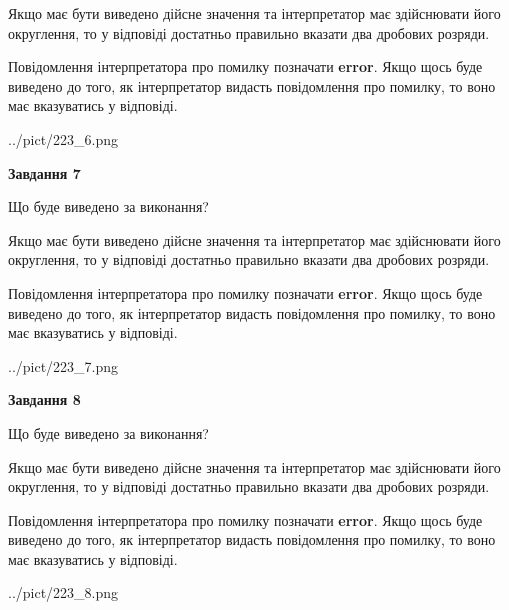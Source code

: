 \documentclass[12pt, ukrainian]{article}
\begin{document}
{\begin {Large}
Якщо має бути виведено дійсне значення та інтерпретатор має здійснювати його округлення, 
то у відповіді достатньо правильно вказати два дробових розряди.

Повідомлення інтерпретатора про помилку позначати \textbf{error}.
Якщо щось буде виведено до того, як інтерпретатор видасть повідомлення про помилку, 
то воно має вказуватись у відповіді. \par

\begin{center}
	{../pict/223_6.png}
\end{center}
\newpage

{\begin {center}\textbf{Завдання 7}\end {center}}\par
Що буде виведено за виконання? \par

Якщо має бути виведено дійсне значення та інтерпретатор має здійснювати його округлення, 
то у відповіді достатньо правильно вказати два дробових розряди.

Повідомлення інтерпретатора про помилку позначати \textbf{error}.
Якщо щось буде виведено до того, як інтерпретатор видасть повідомлення про помилку, 
то воно має вказуватись у відповіді. \par

\begin{center}
	{../pict/223_7.png}
\end{center}
\newpage

{\begin {center}\textbf{Завдання 8}\end {center}}\par
Що буде виведено за виконання? \par

Якщо має бути виведено дійсне значення та інтерпретатор має здійснювати його округлення, 
то у відповіді достатньо правильно вказати два дробових розряди.

Повідомлення інтерпретатора про помилку позначати \textbf{error}.
Якщо щось буде виведено до того, як інтерпретатор видасть повідомлення про помилку, 
то воно має вказуватись у відповіді. \par

\begin{center}
	{../pict/223_8.png}
\end{center}
\newpage


\end{Large}}
\end{document}
